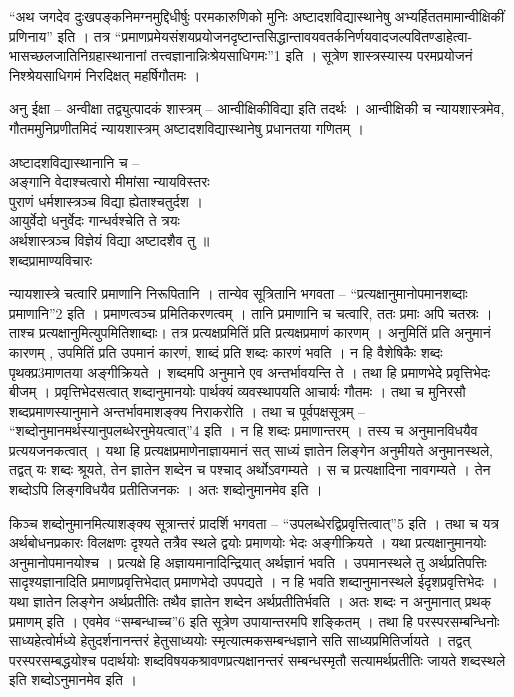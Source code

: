 	“अथ जगदेव दुःखपङ्कनिमग्नमुद्दिधीर्षुः परमकारुणिको मुनिः अष्टादशविद्यास्थानेषु अभ्यर्हिततमामान्वीक्षिकीं प्रणिनाय” इति । तत्र “प्रमाणप्रमेयसंशयप्रयोजनदृष्टान्तसिद्धान्तावयवतर्कनिर्णयवादजल्पवितण्डाहेत्वा-भासच्छलजातिनिग्रहास्थानानां तत्त्वज्ञानान्निःश्रेयसाधिगमः”1 इति । सूत्रेण शास्त्रस्यास्य परमप्रयोजनं निश्श्रेयसाधिगमं निरदिक्षत् महर्षिगौतमः ।

	अनु ईक्षा – अन्वीक्षा तद्व्युत्पादकं शास्त्रम् – आन्वीक्षिकीविद्या इति तदर्थः । आन्वीक्षिकी च न्यायशास्त्रमेव, गौतममुनिप्रणीतमिदं न्यायशास्त्रम् अष्टादशविद्यास्थानेषु प्रधानतया गणितम् । 

	अष्टादशविद्यास्थानानि च – \\
		अङ्गानि वेदाश्चत्वारो मीमांसा न्यायविस्तरः\\ 
		पुराणं धर्मशास्त्रञ्च विद्या ह्येताश्चतुर्दश ।\\
		आयुर्वेदो धनुर्वेदः गान्धर्वश्चेति ते त्रयः \\
		अर्थशास्त्रञ्च विज्ञेयं विद्या अष्टादशैव तु ॥ \\

	शब्दप्रामाण्यविचारः 
	
	न्यायशास्त्रे चत्वारि प्रमाणानि निरूपितानि । तान्येव सूत्रितानि भगवता – “प्रत्यक्षानुमानोपमानशब्दाः प्रमाणानि”2 इति । प्रमाणत्वञ्च प्रमितिकरणत्वम् । तानि प्रमाणानि च चत्वारि, ततः प्रमाः अपि चतस्रः । ताश्च प्रत्यक्षानुमित्युपमितिशाब्दाः। तत्र प्रत्यक्षप्रमितिं प्रति प्रत्यक्षप्रमाणं कारणम् । अनुमितिं प्रति अनुमानं कारणम् , उपमितिं प्रति उपमानं कारणं, शाब्दं प्रति शब्दः कारणं भवति । न हि वैशेषिकैः शब्दः पृथक्प्र3माणतया अङ्गीक्रियते । शब्दमपि अनुमाने एव अन्तर्भावयन्ति ते । तथा हि प्रमाणभेदे प्रवृत्तिभेदः बीजम् । प्रवृत्तिभेदसत्वात् शब्दानुमानयोः पार्थक्यं व्यवस्थापयति आचार्यः गौतमः । तथा च मुनिरसौ शब्दप्रमाणस्यानुमाने अन्तर्भावमाशङ्क्य निराकरोति । तथा च पूर्वपक्षसूत्रम् – “शब्दोनुमानमर्थस्यानुपलब्धेरनुमेयत्वात्”4 इति । न हि शब्दः प्रमाणान्तरम् । तस्य च अनुमानविधयैव प्रत्ययजनकत्वात् । यथा हि प्रत्यक्षप्रमाणेनाज्ञायमानं सत् साध्यं ज्ञातेन लिङ्गेन अनुमीयते अनुमानस्थले, तद्वत् यः शब्दः श्रूयते, तेन ज्ञातेन शब्देन च पश्चाद् अर्थोऽवगम्यते । स च प्रत्यक्षादिना   नावगम्यते । तेन शब्दोऽपि लिङ्गविधयैव प्रतीतिजनकः । अतः शब्दोनुमानमेव  इति ।
	
	किञ्च शब्दोनुमानमित्याशङ्क्य सूत्रान्तरं प्रादर्शि भगवता – “उपलब्धेरद्विप्रवृत्तित्वात्”5 इति । तथा च यत्र अर्थबोधनप्रकारः विलक्षणः दृश्यते तत्रैव स्थले द्वयोः प्रमाणयोः भेदः अङ्गीक्रियते । यथा प्रत्यक्षानुमानयोः अनुमानोपमानयोश्च  । प्रत्यक्षे हि अज्ञायमानादिन्द्रियात् अर्थज्ञानं भवति । उपमानस्थले तु अर्थप्रतिपत्तिः सादृश्यज्ञानादिति प्रमाणप्रवृत्तिभेदात् प्रमाणभेदो उपपद्यते । न हि भवति शब्दानुमानस्थले ईदृशप्रवृत्तिभेदः । यथा ज्ञातेन लिङ्गेन अर्थप्रतीतिः तथैव ज्ञातेन शब्देन अर्थप्रतीतिर्भवति । अतः शब्दः न अनुमानात् प्रथक् प्रमाणम् इति । एवमेव “सम्बन्धाच्च”6 इति सूत्रेण उपायान्तरमपि शङ्कितम् । तथा हि परस्परसम्बन्धिनोः साध्यहेत्वोर्मध्ये हेतुदर्शनानन्तरं हेतुसाध्ययोः स्मृत्यात्मकसम्बन्धज्ञाने सति साध्यप्रमितिर्जायते । तद्वत् परस्परसम्बद्धयोश्च पदार्थयोः शब्दविषयकश्रावणप्रत्यक्षानन्तरं सम्बन्धस्मृतौ सत्यामर्थप्रतीतिः जायते शब्दस्थले इति शब्दोऽनुमानमेव इति । 
	
